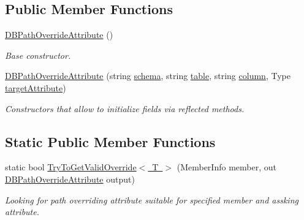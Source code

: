 \subsection*{Public Member Functions}
\begin{DoxyCompactItemize}
\item 
\mbox{\hyperlink{class_uniform_data_operator_1_1_sql_1_1_markup_1_1_modifiers_1_1_d_b_path_override_attribute_aa0ce1c84c617ff1a11bd7ffc5a15f3b0}{D\+B\+Path\+Override\+Attribute}} ()
\begin{DoxyCompactList}\small\item\em Base constructor. \end{DoxyCompactList}\item 
\mbox{\hyperlink{class_uniform_data_operator_1_1_sql_1_1_markup_1_1_modifiers_1_1_d_b_path_override_attribute_ab288054b87a2c351923533496636db2b}{D\+B\+Path\+Override\+Attribute}} (string \mbox{\hyperlink{class_uniform_data_operator_1_1_sql_1_1_markup_1_1_modifiers_1_1_d_b_path_override_attribute_ae30de021946efb358325415cf7e1bde2}{schema}}, string \mbox{\hyperlink{class_uniform_data_operator_1_1_sql_1_1_markup_1_1_modifiers_1_1_d_b_path_override_attribute_a3f5c9e2892d5061f92d59d17b2636acb}{table}}, string \mbox{\hyperlink{class_uniform_data_operator_1_1_sql_1_1_markup_1_1_modifiers_1_1_d_b_path_override_attribute_a30bd9209a06db42db371c857573af3be}{column}}, Type \mbox{\hyperlink{class_uniform_data_operator_1_1_sql_1_1_markup_1_1_modifiers_1_1_d_b_path_override_attribute_ad6b2408b337cc95c58034f0130c89ac8}{target\+Attribute}})
\begin{DoxyCompactList}\small\item\em Constructors that allow to initialize fields via reflected methods. \end{DoxyCompactList}\end{DoxyCompactItemize}
\subsection*{Static Public Member Functions}
\begin{DoxyCompactItemize}
\item 
static bool \mbox{\hyperlink{class_uniform_data_operator_1_1_sql_1_1_markup_1_1_modifiers_1_1_d_b_path_override_attribute_ab7f28cf1f5eda5b9ac5e052a39514aad}{Try\+To\+Get\+Valid\+Override$<$ T $>$}} (Member\+Info member, out \mbox{\hyperlink{class_uniform_data_operator_1_1_sql_1_1_markup_1_1_modifiers_1_1_d_b_path_override_attribute}{D\+B\+Path\+Override\+Attribute}} output)
\begin{DoxyCompactList}\small\item\em Looking for path overriding attribute suitable for specified member and assking attribute. \end{DoxyCompactList}\end{DoxyCompactItemize}
